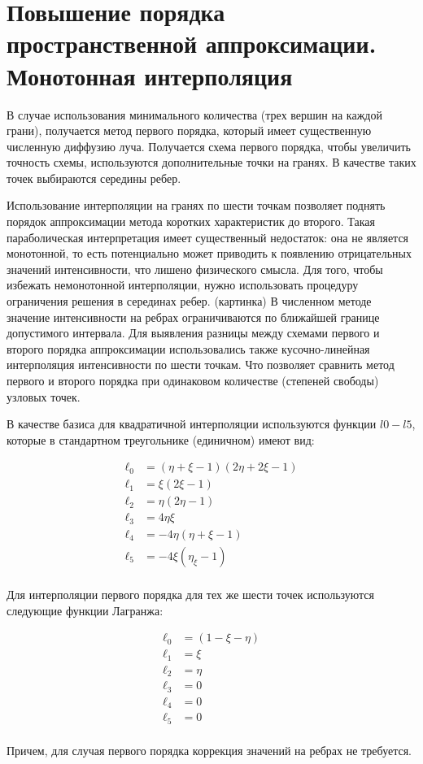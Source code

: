 \section{Повышение порядка пространственной аппроксимации. Монотонная интерполяция}
В случае использования минимального количества (трех вершин на каждой грани), получается метод первого порядка, который имеет существенную численную диффузию луча. Получается схема первого порядка, чтобы увеличить точность схемы, используются дополнительные точки на гранях. В качестве таких точек выбираются середины ребер. 

Использование интерполяции на гранях по шести точкам позволяет поднять порядок аппроксимации метода коротких характеристик до второго. Такая параболическая интерпретация имеет существенный недостаток: она не является монотонной, то есть потенциально может приводить к появлению отрицательных значений интенсивности, что лишено физического смысла. Для того, чтобы избежать немонотонной интерполяции, нужно использовать процедуру ограничения решения в серединах ребер.
(картинка)
В численном методе значение интенсивности на ребрах ограничиваются по ближайшей границе допустимого интервала. Для выявления разницы между схемами первого и второго порядка аппроксимации использовались также кусочно-линейная интерполяция интенсивности по шести точкам. Что позволяет сравнить метод первого и второго порядка при одинаковом количестве (степеней свободы) узловых точек. 

В качестве базиса для квадратичной интерполяции используются функции $l0 - l5$, которые в стандартном треугольнике (единичном) имеют вид:

\begin {equation}
\begin {aligned}
\ell_0 &= (\eta + \xi -1)(2\eta + 2\xi - 1) \\
\ell_1 &= \xi(2\xi - 1) \\
\ell_2 &= \eta (2\eta - 1) \\
\ell_3 &= 4\eta\xi \\
\ell_4 &= -4\eta(\eta + \xi - 1) \\
\ell_5 &= -4\xi(\eta_\xi - 1) \\
\end {aligned}
\end {equation}

Для интерполяции первого порядка для тех же шести точек используются следующие функции Лагранжа:

\begin {equation}
\begin {aligned}
\ell_0 &= (1 - \xi - \eta) \\
\ell_1 &= \xi \\
\ell_2 &= \eta \\
\ell_3 &= 0 \\
\ell_4 &= 0 \\
\ell_5 &= 0 \\
\end {aligned}
\end {equation}

Причем, для случая первого порядка коррекция значений на ребрах не требуется.